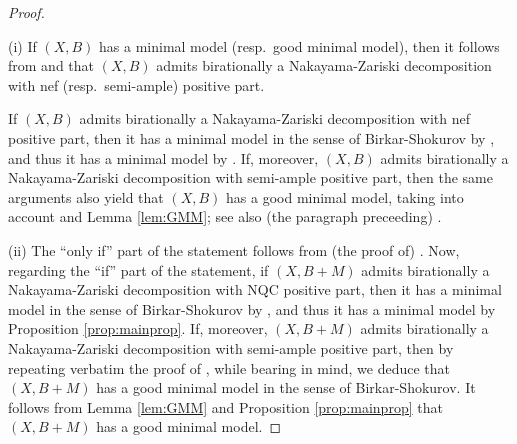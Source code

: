 	\begin{proof}~
		
		\medskip
		
		\noindent (i) If $ (X,B) $ has a minimal model (resp.\ good minimal model), then it follows from \cite[Remark 2.6]{Bir12a} and \cite[Lemma 4.1(2)]{BH14b} that $ (X,B) $ admits birationally a Nakayama-Zariski decomposition with nef (resp.\ semi-ample) positive part. 
		
		If $ (X,B) $ admits birationally a Nakayama-Zariski decomposition with nef positive part, then it has a minimal model in the sense of Birkar-Shokurov by \cite[Theorem 1.1]{BH14b}, and thus it has a minimal model by \cite[Theorem 1.7]{HH20}. If, moreover, $ (X,B) $ admits birationally a Nakayama-Zariski decomposition with semi-ample positive part, then the same arguments also yield that $ (X,B) $ has a good minimal model, taking into account \cite[Theorem 3.25(4)]{KM98} and Lemma \ref{lem:GMM}; see also (the paragraph preceeding) \cite[Theorem 2.23]{Hash20d}. 
		
		\medskip
		
		\noindent (ii) The \enquote{only if} part of the statement follows from (the proof of) \cite[Corollary 3.27]{Tsak21}. Now, regarding the \enquote{if} part of the statement, if $ (X,B+M) $ admits birationally a Nakayama-Zariski decomposition with NQC positive part, then it has a minimal model in the sense of Birkar-Shokurov by \cite[Theorem 4.18]{Tsak21}, and thus it has a minimal model by Proposition \ref{prop:mainprop}. If, moreover, $ (X,B+M) $ admits birationally a Nakayama-Zariski decomposition with semi-ample positive part, then by repeating verbatim the proof of \cite[Theorem 4.18]{Tsak21}, while bearing \cite[2.1.8]{Fuj17} in mind, we deduce that $ (X,B+M) $ has a good minimal model in the sense of Birkar-Shokurov. 
		It follows from Lemma \ref{lem:GMM} and Proposition \ref{prop:mainprop} that $ (X,B+M) $ has a good minimal model.
	\end{proof}
	
